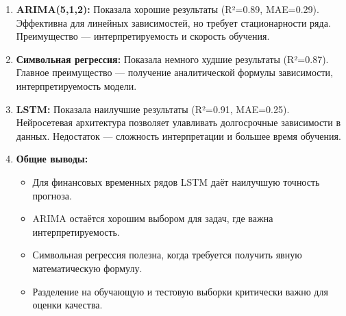 \documentclass[a4paper,12pt]{article}
\begin{document}
\begin{enumerate}
    \item \textbf{ARIMA(5,1,2):} Показала хорошие результаты (R²=0.89, MAE=0.29). Эффективна для линейных зависимостей, но требует стационарности ряда. Преимущество — интерпретируемость и скорость обучения.
    
    \item \textbf{Символьная регрессия:} Показала немного худшие результаты (R²=0.87). Главное преимущество — получение аналитической формулы зависимости, интерпретируемость модели.
    
    \item \textbf{LSTM:} Показала наилучшие результаты (R²=0.91, MAE=0.25). Нейросетевая архитектура позволяет улавливать долгосрочные зависимости в данных. Недостаток — сложность интерпретации и большее время обучения.
    
    \item \textbf{Общие выводы:}
    \begin{itemize}
        \item Для финансовых временных рядов LSTM даёт наилучшую точность прогноза.
        \item ARIMA остаётся хорошим выбором для задач, где важна интерпретируемость.
        \item Символьная регрессия полезна, когда требуется получить явную математическую формулу.
        \item Разделение на обучающую и тестовую выборки критически важно для оценки качества.
    \end{itemize}
\end{enumerate}
\end{document}
